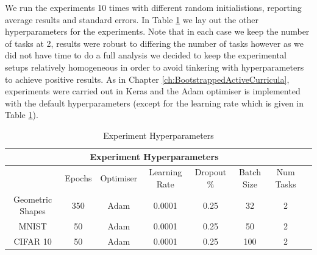 We run the experiments 10 times with different random initialistions, reporting average results and standard errors. In Table \ref{tab:HyperParams2} we lay out the other hyperparameters for the experiments. Note that in each case we keep the number of tasks at 2, results were robust to differing the number of tasks however as we did not have time to do a full analysis we decided to keep the experimental setups relatively homogeneous in order to avoid tinkering with hyperparameters to achieve positive results. As in Chapter \ref{ch:BootstrappedActiveCurricula}, experiments were carried out in Keras \cite{chollet2015keras} and the Adam optimiser is implemented with the default hyperparameters (except for the learning rate which is given in Table \ref{tab:HyperParams2}). 

\begin{table}[h!]
\caption{Experiment Hyperparameters} \label{tab:HyperParams2}
\hspace*{-2cm}
\begin{tabular}{|c||c|c|c|c|c|c|c|}
\hline
\multicolumn{7}{|c|}{Experiment Hyperparameters} \\
\hline
 &Epochs & Optimiser &Learning Rate & Dropout \% & Batch Size & Num Tasks\\
\hline
Geometric Shapes & 350 & Adam & 0.0001 & 0.25 & 32 & 2  \\
\hline
MNIST & 50 & Adam & 0.0001 & 0.25 & 50 & 2  \\
\hline
CIFAR 10 & 50 & Adam & 0.0001 & 0.25 & 100 & 2  \\
\hline
\end{tabular}
\end{table}


